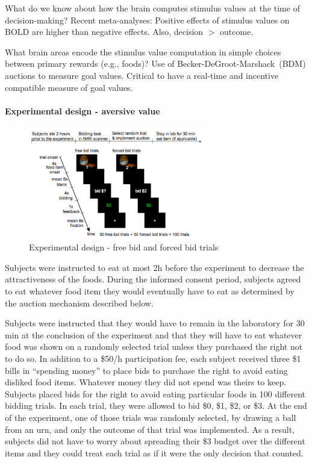 \documentclass[12pt,article,oneside,a4paper]{memoir}
\begin{document}
What do we know about how the brain computes stimulus values at the time of
decision-making? Recent meta-analyses: Positive effects of stimulus values on
BOLD are higher than negative effects. Also, decision $>$ outcome.

What brain areas encode the stimulus value computation in simple choices between
primary rewards (e.g., foods)? Use of Becker-DeGroot-Marshack~(BDM) auctions to
measure goal values. Critical to have a real-time and incentive compatible
measure of goal values.

\paragraph{Experimental design - aversive value}

\begin{figure}[h]
  \centering
  \includegraphics[width=0.7\textwidth]{imgs/experimental-design.png}
  \caption{Experimental design - free bid and forced bid trials}
  \label{fig:experimental-design}
\end{figure}

Subjects were instructed to eat at most 2h before the experiment to decrease
the attractiveness of the foods. During the informed consent period, subjects
agreed to eat whatever food item they would eventually have to eat as
determined by the auction mechanism described below.

Subjects were instructed that they would have to remain in the laboratory for
30 min at the conclusion of the experiment and that they will have to eat
whatever food was shown on a randomly selected trial unless they purchased the
right not to do so. In addition to a \$50/h participation fee, each subject
received three \$1 bills in ``spending money'' to place bids to purchase the
right to avoid eating disliked food items.
Whatever money they did not spend was theirs to keep. Subjects placed bids for
the right to avoid eating particular foods in 100 different bidding trials.
In each trial, they were allowed to bid \$0, \$1, \$2, or \$3. At the end of
the experiment, one of those trials was randomly selected, by drawing a ball
from an urn, and only the outcome of that trial was implemented.
As a result, subjects did not have to worry about spreading their \$3 budget
over the different items and they could treat each trial as if it were the only
decision that counted.
\end{document}
